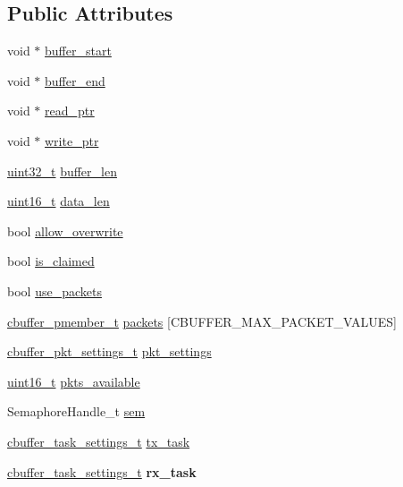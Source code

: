 \subsection*{Public Attributes}
\begin{DoxyCompactItemize}
\item 
void $\ast$ \hyperlink{structCBuffer__Handle_ace9001395e4926b7da1c5ec82afd20b3}{buffer\+\_\+start}
\item 
void $\ast$ \hyperlink{structCBuffer__Handle_aa8573cb52319451c021516d1a906c970}{buffer\+\_\+end}
\item 
void $\ast$ \hyperlink{structCBuffer__Handle_a3e996c49d0c489498b43d16ff1df810b}{read\+\_\+ptr}
\item 
void $\ast$ \hyperlink{structCBuffer__Handle_a301255119721b1cc76531ffc045594fb}{write\+\_\+ptr}
\item 
\hyperlink{vl53l0x__types_8h_a435d1572bf3f880d55459d9805097f62}{uint32\+\_\+t} \hyperlink{structCBuffer__Handle_af0549758ada54a9e9117a0c4ff0a4955}{buffer\+\_\+len}
\item 
\hyperlink{vl53l0x__types_8h_a273cf69d639a59973b6019625df33e30}{uint16\+\_\+t} \hyperlink{structCBuffer__Handle_aed2d7a4a93b8f607d51b93300c5837b5}{data\+\_\+len}
\item 
bool \hyperlink{structCBuffer__Handle_a1a41fc5596188b457815ca1c5afafccd}{allow\+\_\+overwrite}
\item 
bool \hyperlink{structCBuffer__Handle_a7019a6c91cfbcc0e02e11b8895450cc6}{is\+\_\+claimed}
\item 
bool \hyperlink{structCBuffer__Handle_ad6156a0a6134052e1620d8cd9fb5154b}{use\+\_\+packets}
\item 
\hyperlink{structCBuffer__packet__member}{cbuffer\+\_\+pmember\+\_\+t} \hyperlink{structCBuffer__Handle_ad2465a41c6b7bf39ea5a11d47836e841}{packets} \mbox{[}C\+B\+U\+F\+F\+E\+R\+\_\+\+M\+A\+X\+\_\+\+P\+A\+C\+K\+E\+T\+\_\+\+V\+A\+L\+U\+ES\mbox{]}
\item 
\hyperlink{structcbuffer__packet__settings}{cbuffer\+\_\+pkt\+\_\+settings\+\_\+t} \hyperlink{structCBuffer__Handle_aa8610091db61fb607b93b5374b076307}{pkt\+\_\+settings}
\item 
\hyperlink{vl53l0x__types_8h_a273cf69d639a59973b6019625df33e30}{uint16\+\_\+t} \hyperlink{structCBuffer__Handle_a54e07db8fad941c1ec2b5eadbeeeb16e}{pkts\+\_\+available}
\item 
Semaphore\+Handle\+\_\+t \hyperlink{structCBuffer__Handle_a3774a4f2a54b9cd40367b87ee52c5e69}{sem}
\item 
\hyperlink{structCBuffer__tasks}{cbuffer\+\_\+task\+\_\+settings\+\_\+t} \hyperlink{structCBuffer__Handle_acf4f92865eae15d0c64e94550bb0ac9a}{tx\+\_\+task}
\item 
\mbox{\label{structCBuffer__Handle_ad57ecec79ac6e597d9bc5d093ed26cc5}} 
\hyperlink{structCBuffer__tasks}{cbuffer\+\_\+task\+\_\+settings\+\_\+t} {\bfseries rx\+\_\+task}
\end{DoxyCompactItemize}


